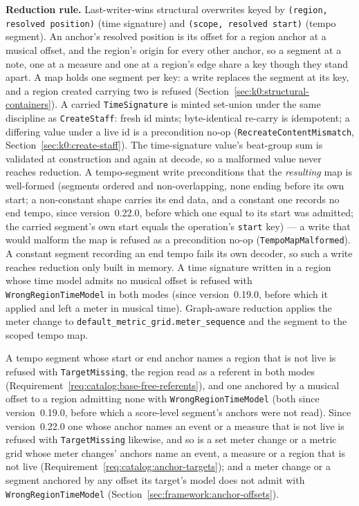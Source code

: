 \documentclass[11pt,letterpaper]{report}
\begin{document}
\textbf{Reduction rule.} Last-writer-wins structural overwrites keyed by
\texttt{(region, resolved position)} (time signature) and \texttt{(scope,
resolved start)} (tempo segment). An anchor's resolved position is its offset
for a region anchor at a musical offset, and the region's origin for every
other anchor, so a segment at a note, one at a measure and one at a region's
edge share a key though they stand apart. A map holds one segment per key: a
write replaces the segment at its key, and a region created carrying two is
refused (Section~\ref{sec:k0:structural-containers}). A carried \texttt{TimeSignature} is minted
set-union under the same discipline as \texttt{CreateStaff}: fresh id mints;
byte-identical re-carry is idempotent; a differing value under a live id is a
precondition no-op (\texttt{RecreateContentMismatch},
Section~\ref{sec:k0:create-staff}). The time-signature value's beat-group sum is validated at
construction and again at decode, so a malformed value never reaches
reduction. A tempo-segment write preconditions that the \emph{resulting} map
is well-formed (segments ordered and non-overlapping, none ending before its
own start; a non-constant shape carries its end data, and a constant one records no end tempo, since
version~0.22.0, before which one equal to its start was admitted; the carried
segment's own start equals the operation's \texttt{start} key) --- a write
that would malform the map is refused as a precondition no-op
(\texttt{TempoMapMalformed}). A constant segment recording an end tempo fails
its own decoder, so such a write reaches reduction only built in memory. A time signature written in a
region whose time model admits no musical offset is refused with
\texttt{WrongRegionTimeModel} in both modes (since version~0.19.0, before which
it applied and left a meter in musical time). Graph-aware reduction applies
the meter change to \texttt{default\_metric\_grid.meter\_sequence} and the
segment to the scoped tempo map.

A tempo segment whose start or end anchor names a region that is not live is
refused with \texttt{TargetMissing}, the region read as a referent in both
modes (Requirement~\ref{req:catalog:base-free-referents}), and one anchored by
a musical offset to a region admitting none with \texttt{WrongRegionTimeModel}
(both since version~0.19.0, before which a score-level segment's anchors were
not read). Since version~0.22.0 one whose anchor names an event or a measure
that is not live is refused with \texttt{TargetMissing} likewise, and so is a
set meter change or a metric grid whose meter changes' anchors name an event,
a measure or a region that is not live
(Requirement~\ref{req:catalog:anchor-targets}); and a meter
change or a segment anchored by any offset its target's model does not admit
with \texttt{WrongRegionTimeModel} (Section~\ref{sec:framework:anchor-offsets}).
\end{document}
